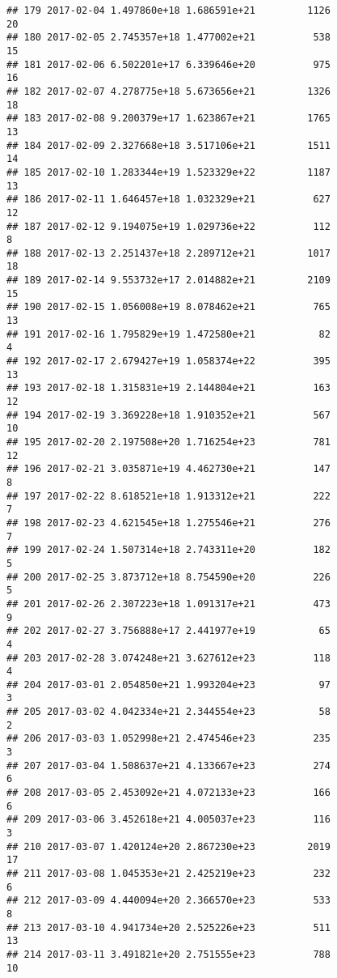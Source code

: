 \documentclass[]{article}
\begin{document}
\begin{verbatim}
## 179 2017-02-04 1.497860e+18 1.686591e+21         1126              20
## 180 2017-02-05 2.745357e+18 1.477002e+21          538              15
## 181 2017-02-06 6.502201e+17 6.339646e+20          975              16
## 182 2017-02-07 4.278775e+18 5.673656e+21         1326              18
## 183 2017-02-08 9.200379e+17 1.623867e+21         1765              13
## 184 2017-02-09 2.327668e+18 3.517106e+21         1511              14
## 185 2017-02-10 1.283344e+19 1.523329e+22         1187              13
## 186 2017-02-11 1.646457e+18 1.032329e+21          627              12
## 187 2017-02-12 9.194075e+19 1.029736e+22          112               8
## 188 2017-02-13 2.251437e+18 2.289712e+21         1017              18
## 189 2017-02-14 9.553732e+17 2.014882e+21         2109              15
## 190 2017-02-15 1.056008e+19 8.078462e+21          765              13
## 191 2017-02-16 1.795829e+19 1.472580e+21           82               4
## 192 2017-02-17 2.679427e+19 1.058374e+22          395              13
## 193 2017-02-18 1.315831e+19 2.144804e+21          163              12
## 194 2017-02-19 3.369228e+18 1.910352e+21          567              10
## 195 2017-02-20 2.197508e+20 1.716254e+23          781              12
## 196 2017-02-21 3.035871e+19 4.462730e+21          147               8
## 197 2017-02-22 8.618521e+18 1.913312e+21          222               7
## 198 2017-02-23 4.621545e+18 1.275546e+21          276               7
## 199 2017-02-24 1.507314e+18 2.743311e+20          182               5
## 200 2017-02-25 3.873712e+18 8.754590e+20          226               5
## 201 2017-02-26 2.307223e+18 1.091317e+21          473               9
## 202 2017-02-27 3.756888e+17 2.441977e+19           65               4
## 203 2017-02-28 3.074248e+21 3.627612e+23          118               4
## 204 2017-03-01 2.054850e+21 1.993204e+23           97               3
## 205 2017-03-02 4.042334e+21 2.344554e+23           58               2
## 206 2017-03-03 1.052998e+21 2.474546e+23          235               3
## 207 2017-03-04 1.508637e+21 4.133667e+23          274               6
## 208 2017-03-05 2.453092e+21 4.072133e+23          166               6
## 209 2017-03-06 3.452618e+21 4.005037e+23          116               3
## 210 2017-03-07 1.420124e+20 2.867230e+23         2019              17
## 211 2017-03-08 1.045353e+21 2.425219e+23          232               6
## 212 2017-03-09 4.440094e+20 2.366570e+23          533               8
## 213 2017-03-10 4.941734e+20 2.525226e+23          511              13
## 214 2017-03-11 3.491821e+20 2.751555e+23          788              10

\end{verbatim}
\end{document}
